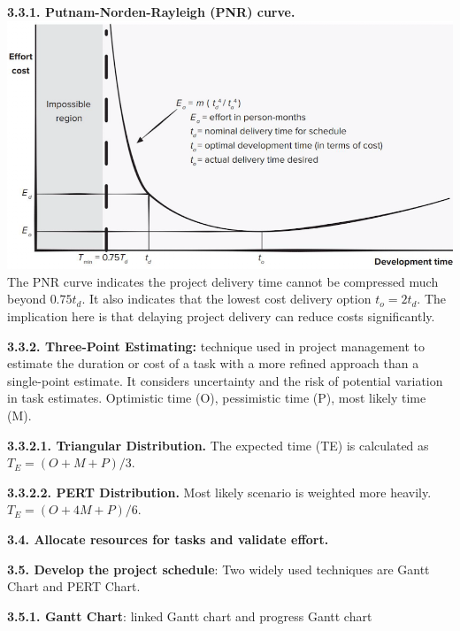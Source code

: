         \textbf{3.3.1. Putnam-Norden-Rayleigh (PNR) curve.}
        \includegraphics[width=\linewidth]{figs/SCR-20240606-ozjp.png}
        The PNR curve indicates the project delivery time cannot be compressed much beyond $0.75t_d$. It also indicates that the lowest cost delivery option $t_o = 2t_d$. The implication here is that delaying project delivery can reduce costs significantly.

        \textbf{3.3.2. Three-Point Estimating:} technique used in project management to estimate the duration or cost of a task with a more refined approach than a single-point estimate. It considers uncertainty and the risk of potential variation in task estimates. Optimistic time (O), pessimistic time (P), most likely time (M).

            \textbf{3.3.2.1. Triangular Distribution.}
            The expected time (TE) is calculated as $T_E = (O + M + P) / 3$.

            \textbf{3.3.2.2. PERT Distribution.}
            Most likely scenario is weighted more heavily. $T_E = (O + 4M + P) / 6$.

    \textbf{3.4. Allocate resources for tasks and validate effort.}


    \textbf{3.5. Develop the project schedule}: Two widely used techniques are Gantt Chart and PERT Chart.

        \textbf{3.5.1. Gantt Chart}: linked Gantt chart and progress Gantt chart

